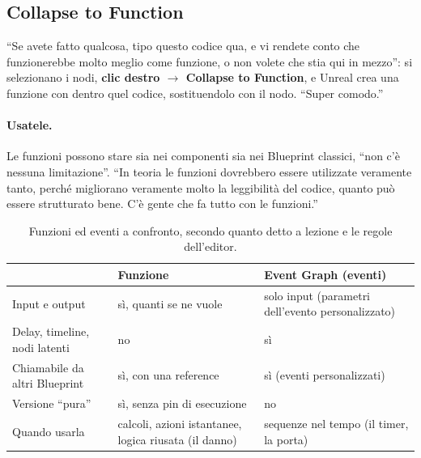 \subsection{Collapse to Function}

``Se avete fatto qualcosa, tipo questo codice qua, e vi rendete conto che
funzionerebbe molto meglio come funzione, o non volete che stia qui in mezzo'':
si selezionano i nodi, \textbf{clic destro $\rightarrow$ Collapse to Function},
e Unreal crea una funzione con dentro quel codice, sostituendolo con il nodo.
``Super comodo.''

\paragraph{Usatele.} Le funzioni possono stare sia nei componenti sia nei
Blueprint classici, ``non c'è nessuna limitazione''. ``In teoria le funzioni
dovrebbero essere utilizzate veramente tanto, perché migliorano veramente molto
la leggibilità del codice, quanto può essere strutturato bene. C'è gente che fa
tutto con le funzioni.''

\begin{table}[htbp]
\centering
\small
\begin{tabular}{p{3.6cm}p{4.4cm}p{4.8cm}}
\toprule
 & \textbf{Funzione} & \textbf{Event Graph (eventi)}\\
\midrule
Input e output & sì, quanti se ne vuole & solo input (parametri
dell'evento personalizzato)\\
Delay, timeline, nodi latenti & no & sì\\
Chiamabile da altri Blueprint & sì, con una reference & sì (eventi
personalizzati)\\
Versione ``pura'' & sì, senza pin di esecuzione & no\\
Quando usarla & calcoli, azioni istantanee, logica riusata (il danno) &
sequenze nel tempo (il timer, la porta)\\
\bottomrule
\end{tabular}
\caption{Funzioni ed eventi a confronto, secondo quanto detto a lezione e le
regole dell'editor.}
\label{gd13:tab:funzioni}
\end{table}

